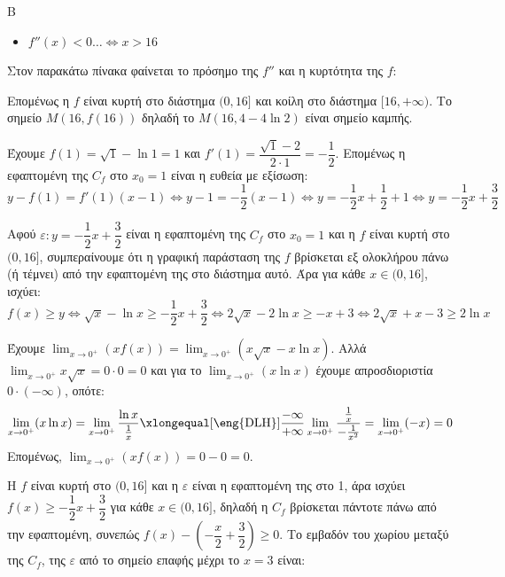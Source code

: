 \begin{thema}{Β}
\begin{erwthma}
\begin{itemize}
    \item $f''(x) < 0 \dots \Leftrightarrow x>16$
\end{itemize}
Στον παρακάτω πίνακα φαίνεται το πρόσημο της $f''$ και η κυρτότητα της $f$:
\begin{center}
\end{center}
Επομένως η $f$ είναι κυρτή στο διάστημα $(0, 16]$ και κοίλη στο διάστημα $[16, +\infty)$. Το σημείο $M(16, f(16))$ δηλαδή το $M(16, 4-4\ln 2)$ είναι σημείο καμπής.
\item Έχουμε $f(1) = \sqrt{1} - \ln 1 = 1$ και $f'(1) = \dfrac{\sqrt{1}-2}{2\cdot 1} = -\dfrac{1}{2}$. Επομένως η εφαπτομένη της $C_f$ στο $x_0=1$ είναι η ευθεία με εξίσωση:
\[y - f(1) = f'(1)(x-1) \Leftrightarrow y - 1 = -\dfrac{1}{2}(x-1) \Leftrightarrow y = -\dfrac{1}{2}x + \dfrac{1}{2} + 1 \Leftrightarrow y = -\dfrac{1}{2}x + \dfrac{3}{2}\]
\item Αφού $\varepsilon: y = -\dfrac{1}{2}x + \dfrac{3}{2}$ είναι η εφαπτομένη της $C_f$ στο $x_0=1$ και η $f$ είναι κυρτή στο $(0, 16]$, συμπεραίνουμε ότι η γραφική παράσταση της $f$ βρίσκεται εξ ολοκλήρου πάνω (ή τέμνει) από την εφαπτομένη της στο διάστημα αυτό. Άρα για κάθε $x \in (0, 16]$, ισχύει:
\[f(x) \ge y \Leftrightarrow \sqrt{x} - \ln x \ge -\dfrac{1}{2}x + \dfrac{3}{2} \Leftrightarrow 2\sqrt{x} - 2\ln x \ge -x + 3 \Leftrightarrow 2\sqrt{x} + x - 3 \ge 2\ln x\]
\item Έχουμε $\displaystyle\lim_{x\to0^+} (xf(x)) = \lim_{x\to0^+} (x\sqrt{x} - x\ln x)$.
Αλλά $\displaystyle\lim_{x\to0^+} x\sqrt{x} = 0 \cdot 0 = 0$ και για το $\displaystyle\lim_{x\to0^+} (x\ln x)$ έχουμε απροσδιοριστία $0 \cdot (-\infty)$, οπότε:
\[\lim_{x\to0^+} (x\ln x) = \lim_{x\to0^+} \dfrac{\ln x}{\frac{1}{x}} \xlongequal[\text{\eng{DLH}}]{\frac{-\infty}{+\infty}} \lim_{x\to0^+} \dfrac{\frac{1}{x}}{-\frac{1}{x^2}} = \lim_{x\to0^+} (-x) = 0\]
Επομένως, $\displaystyle\lim_{x\to0^+} (xf(x)) = 0 - 0 = 0$.
\item Η $f$ είναι κυρτή στο $(0, 16]$ και η $\varepsilon$ είναι η εφαπτομένη της στο 1, άρα ισχύει $f(x) \ge -\dfrac{1}{2}x + \dfrac{3}{2}$ για κάθε $x \in (0, 16]$, δηλαδή η $C_f$ βρίσκεται πάντοτε πάνω από την εφαπτομένη, συνεπώς $f(x) - \left(-\dfrac{x}{2} + \dfrac{3}{2}\right) \ge 0$. Το εμβαδόν του χωρίου μεταξύ της $C_f$, της $\varepsilon$ από το σημείο επαφής μέχρι το $x=3$ είναι:

\end{erwthma}
\end{thema}
